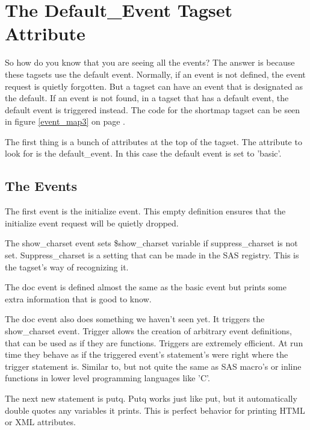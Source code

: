\section{The Default\_Event Tagset Attribute}
So how do you know that you are seeing all the events?  The
answer is because these tagsets use the default event.
Normally, if an event is not defined, the event request
is quietly forgotten.  But a tagset can have an event that
is designated as the default.  If an event is not found,
in a tagset that has a default event, the default event
is triggered instead.  The code for the shortmap tagset
can be seen 
in figure \ref{event_map3} on page \pageref{event_map3}.

The first thing is a bunch of
attributes at the top of the tagset.  
The attribute to look for is the default\_event.  In this 
case the default event is set to 'basic'.

\subsection{The Events}
The first event is the initialize event.  This empty definition ensures
that the initialize event request will be quietly dropped.

The show\_charset event sets \$show\_charset variable if
suppress\_charset is not set.  Suppress\_charset is a setting
that can be made in the SAS registry.  This is the tagset's way
of recognizing it.


The doc event is defined almost the same as the basic 
event but prints some extra information that is good to
know. 

The doc event also does something we haven't seen yet.  It 
triggers the show\_charset event.  Trigger allows the creation
of arbitrary event definitions, that can be used as if they
are functions.
Triggers are extremely efficient.  At run time they behave as
if the triggered event's statement's were right where the trigger
statement is.  Similar to, but not quite the same as SAS macro's
or inline functions in lower level programming languages like 'C'.

The next new statement is putq.  Putq works just like put,
but it automatically double quotes any variables it prints.
This is perfect behavior for printing HTML or XML attributes.

